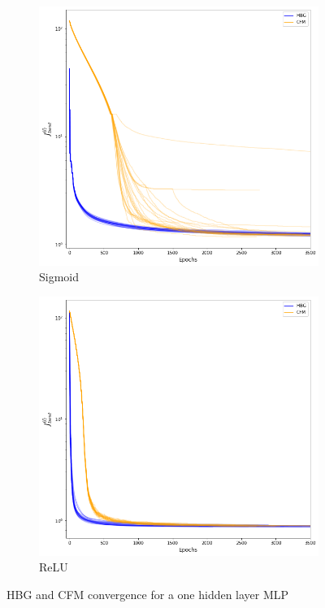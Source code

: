\begin{figure}[htbp]
    \centering
    \begin{subfigure}{.5\textwidth}
        \centering
        \includegraphics[width=.9\textwidth]{images/h1_sigmoid.png}
        \caption{Sigmoid}
        \label{fig:h1_sigmoid}
    \end{subfigure}%
    \begin{subfigure}{.5\textwidth}
        \centering
        \includegraphics[width=.9\textwidth]{images/h1_relu.png}
        \caption{ReLU}
        \label{fig:h1_relu}
    \end{subfigure}
    \caption{HBG and CFM convergence for a one hidden layer MLP}
    \label{fig:h1}
\end{figure}

